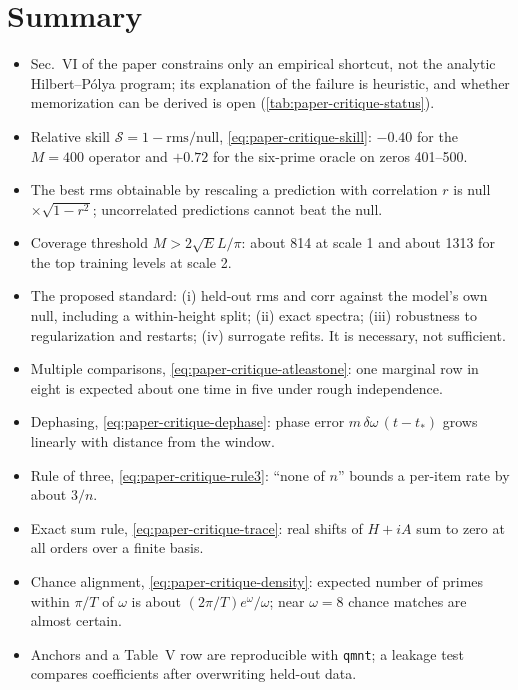 \section{Summary}\label{sec:paper-critique-summary}

\begin{itemize}
\item Sec.~VI of the paper constrains only an empirical shortcut, not the analytic Hilbert--P\'olya program; its explanation of the failure is heuristic, and whether memorization can be derived is open (\cref{tab:paper-critique-status}).
\item Relative skill $\mathcal{S}=1-\text{rms}/\text{null}$, \eqref{eq:paper-critique-skill}: $-0.40$ for the $M=400$ operator and $+0.72$ for the six-prime oracle on zeros 401--500.
\item The best rms obtainable by rescaling a prediction with correlation $r$ is null$\times\sqrt{1-r^2}$; uncorrelated predictions cannot beat the null.
\item Coverage threshold $M>2\sqrt EL/\pi$: about 814 at scale 1 and about 1313 for the top training levels at scale 2.
\item The proposed standard: (i) held-out rms and corr against the model's own null, including a within-height split; (ii) exact spectra; (iii) robustness to regularization and restarts; (iv) surrogate refits. It is necessary, not sufficient.
\item Multiple comparisons, \eqref{eq:paper-critique-atleastone}: one marginal row in eight is expected about one time in five under rough independence.
\item Dephasing, \eqref{eq:paper-critique-dephase}: phase error $m\,\delta\omega\,(t-t_*)$ grows linearly with distance from the window.
\item Rule of three, \eqref{eq:paper-critique-rule3}: ``none of $n$'' bounds a per-item rate by about $3/n$.
\item Exact sum rule, \eqref{eq:paper-critique-trace}: real shifts of $H+iA$ sum to zero at all orders over a finite basis.
\item Chance alignment, \eqref{eq:paper-critique-density}: expected number of primes within $\pi/T$ of $\omega$ is about $(2\pi/T)e^\omega/\omega$; near $\omega=8$ chance matches are almost certain.
\item Anchors and a Table~V row are reproducible with \texttt{qmnt}; a leakage test compares coefficients after overwriting held-out data.
\end{itemize}

